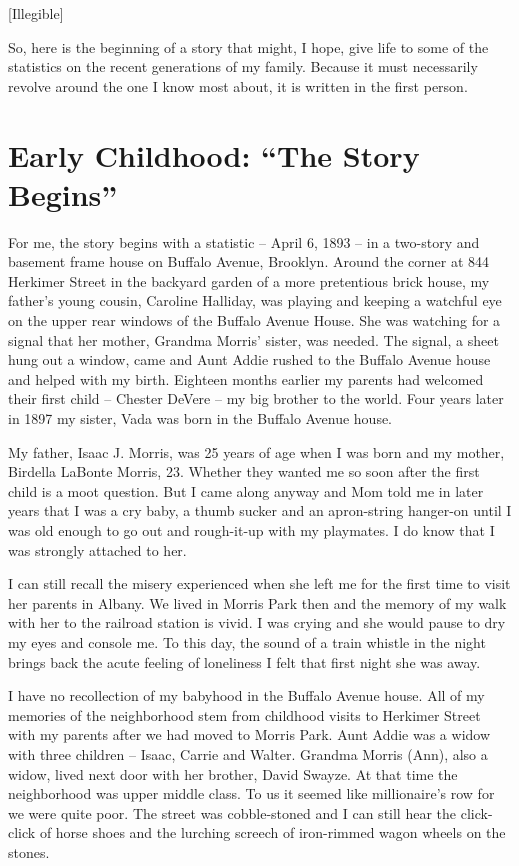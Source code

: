 \documentclass[12pt]{book}              %
\begin{document}
[Illegible]

So, here is the beginning of a story that might, I hope, give life to some of the statistics on the recent generations of my family. Because it must necessarily revolve around the one I know most about, it is written in the first person. 

\chapter{Early Childhood: ``The Story Begins''}

For me, the story begins with a statistic -- April 6, 1893 -- in a two-story and basement frame house on Buffalo Avenue, Brooklyn. Around the corner at 844 Herkimer Street in the backyard garden of a more pretentious brick house, my father's young cousin, Caroline Halliday, was playing and keeping a watchful eye on the upper rear windows of the Buffalo Avenue House. She was watching for a signal that her mother, Grandma Morris' sister, was needed. The signal, a sheet hung out a window, came and Aunt Addie rushed to the Buffalo Avenue house and helped with my birth. Eighteen months earlier my parents had welcomed their first child -- Chester DeVere -- my big brother to the world. Four years later in 1897 my sister, Vada was born in the Buffalo Avenue house.

My father, Isaac J. Morris, was 25 years of age when I was born and my mother, Birdella LaBonte Morris, 23. Whether they wanted me so soon after the first child is a moot question. But I came along anyway and Mom told me in later years that I was a cry baby, a thumb sucker and an apron-string hanger-on until I was old enough to go out and rough-it-up with my playmates. I do know that I was strongly attached to her. 

I can still recall the misery experienced when she left me for the first time to visit her parents in Albany. We lived in Morris Park then and the memory of my walk with her to the railroad station is vivid. I was crying and she would pause to dry my eyes and console me. To this day, the sound of a train whistle in the night brings back the acute feeling of loneliness I felt that first night she was away. 

I have no recollection of my babyhood in the Buffalo Avenue house. All of my memories of the neighborhood stem from childhood visits to Herkimer Street with my parents after we had moved to Morris Park. Aunt Addie was a widow with three children -- Isaac, Carrie and Walter. Grandma Morris (Ann), also a widow, lived next door with her brother, David Swayze. At that time the neighborhood was upper middle class. To us it seemed like millionaire's row for we were quite poor. The street was cobble-stoned and I can still hear the click-click of horse shoes and the lurching screech of iron-rimmed wagon wheels on the stones. 
\end{document}
